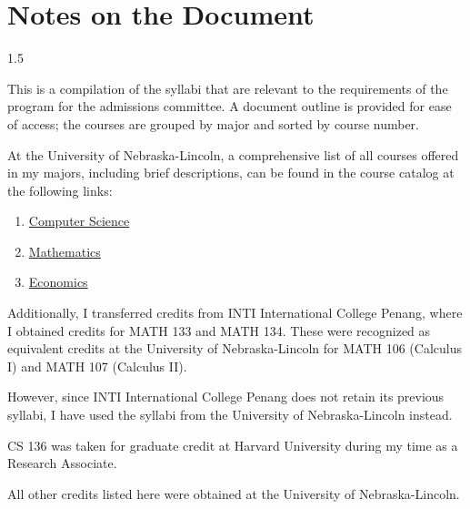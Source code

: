 \documentclass[10pt, a4paper]{article}
\begin{document}
%

{
\selectfont %
\fontsize{10pt}{12pt}\selectfont

}


\newpage

\tableofcontents
\newpage

\section{Notes on the Document}
\label{sec: notes on document}

\begin{spacing}{1.5}

This is a compilation of the syllabi that are relevant to the requirements of the program for the admissions committee. A document outline is provided for ease of access; the courses are grouped by major and sorted by course number.

At the University of Nebraska-Lincoln, a comprehensive list of all courses offered in my majors, including brief descriptions, can be found in the course catalog at the following links:

\begin{enumerate}
    \item \href{https://catalog.unl.edu/undergraduate/engineering/computer-science/#newitemtext}{Computer Science}
    \item \href{https://catalog.unl.edu/undergraduate/courses/math/}{Mathematics}
    \item \href{https://catalog.unl.edu/undergraduate/courses/econ/}{Economics}
\end{enumerate}

Additionally, I transferred credits from INTI International College Penang, where I obtained credits for MATH 133 and MATH 134. These were recognized as equivalent credits at the University of Nebraska-Lincoln for MATH 106 (Calculus I) and MATH 107 (Calculus II). 

However, since INTI International College Penang does not retain its previous syllabi, I have used the syllabi from the University of Nebraska-Lincoln instead.

CS 136 was taken for graduate credit at Harvard University during my time as a Research Associate.

All other credits listed here were obtained at the University of Nebraska-Lincoln.

\end{spacing}
\end{document}

